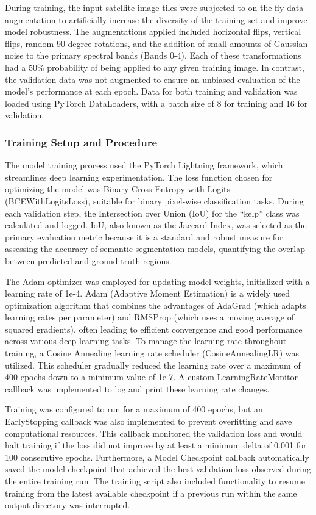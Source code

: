 \documentclass{article}
\begin{document}
During training, the input satellite image tiles were subjected to on-the-fly data augmentation to artificially increase the diversity of the training set and improve model robustness. The augmentations applied included horizontal flips, vertical flips, random 90-degree rotations, and the addition of small amounts of Gaussian noise to the primary spectral bands (Bands 0-4). Each of these transformations had a 50\% probability of being applied to any given training image. In contrast, the validation data was not augmented to ensure an unbiased evaluation of the model's performance at each epoch. Data for both training and validation was loaded using PyTorch DataLoaders, with a batch size of 8 for training and 16 for validation.

\subsubsection{Training Setup and Procedure}

The model training process used the PyTorch Lightning framework, which streamlines deep learning experimentation. The loss function chosen for optimizing the model was Binary Cross-Entropy with Logits (BCEWithLogitsLoss), suitable for binary pixel-wise classification tasks. During each validation step, the Intersection over Union (IoU) for the ``kelp'' class was calculated and logged. IoU, also known as the Jaccard Index, was selected as the primary evaluation metric because it is a standard and robust measure for assessing the accuracy of semantic segmentation models, quantifying the overlap between predicted and ground truth regions.

The Adam optimizer was employed for updating model weights, initialized with a learning rate of 1e-4. Adam (Adaptive Moment Estimation) is a widely used optimization algorithm that combines the advantages of AdaGrad (which adapts learning rates per parameter) and RMSProp (which uses a moving average of squared gradients), often leading to efficient convergence and good performance across various deep learning tasks. To manage the learning rate throughout training, a Cosine Annealing learning rate scheduler (CosineAnnealingLR) was utilized. This scheduler gradually reduced the learning rate over a maximum of 400 epochs down to a minimum value of 1e-7. A custom LearningRateMonitor callback was implemented to log and print these learning rate changes.

Training was configured to run for a maximum of 400 epochs, but an EarlyStopping callback was also implemented to prevent overfitting and save computational resources. This callback monitored the validation loss and would halt training if the loss did not improve by at least a minimum delta of 0.001 for 100 consecutive epochs. Furthermore, a Model Checkpoint callback automatically saved the model checkpoint that achieved the best validation loss observed during the entire training run. The training script also included functionality to resume training from the latest available checkpoint if a previous run within the same output directory was interrupted.
\end{document}
